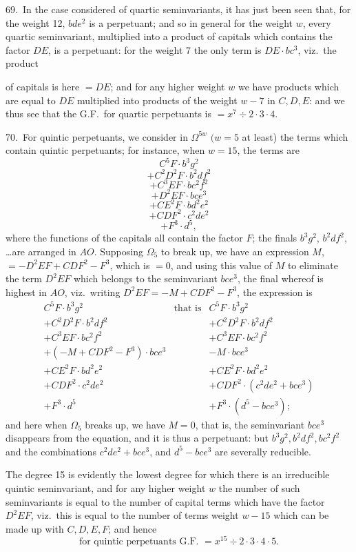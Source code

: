 \documentclass[11pt]{article}
\begin{document}
69.\ In the case considered of quartic seminvariants, it has just been seen that, for the weight 12, $bde^2$ is a perpetuant; and so in general for the weight $w$, every quartic seminvariant, multiplied into a product of capitals which contains the factor $DE$, is a perpetuant: for the weight 7 the only term is $DE \cdot bc^3$, viz.\ the product

\clearpage
of capitals is here $= DE$; and for any higher weight $w$ we have products which are equal to $DE$ multiplied into products of the weight $w - 7$ in $C, D, E$: and we thus see that the G.F.\ for quartic perpetuants is $= x^7 \div 2 \cdot 3 \cdot 4$.

70.\ For quintic perpetuants, we consider in $\Omega^{5w}$ $(w = 5$ at least) the terms which contain quintic perpetuants; for instance, when $w = 15$, the terms are
\[
C^5F \cdot b^3g^2
\]
\[
+ C^2D^2F \cdot b^2df^2
\]
\[
+ C^3EF \cdot bc^2f^2
\]
\[
+ D^2EF \cdot bce^3
\]
\[
+ CE^2F \cdot bd^2e^2
\]
\[
+ CDF^2 \cdot c^2de^2
\]
\[
+ F^3 \cdot d^5,
\]
where the functions of the capitals all contain the factor $F$; the finals $b^3g^2$, $b^2df^2$, \ldots are arranged in $AO$. Supposing $\Omega_5$ to break up, we have an expression $M$, $= -D^2EF + CDF^2 - F^3$, which is $= 0$, and using this value of $M$ to eliminate the term $D^2EF$ which belongs to the seminvariant $bce^3$, the final whereof is highest in $AO$, viz.\ writing $D^2EF = -M + CDF^2 - F^3$, the expression is
\[
\begin{array}{lll}
C^5F \cdot b^3g^2 & \text{that is} & C^5F \cdot b^3g^2 \\
+ C^2D^2F \cdot b^2df^2 & & + C^2D^2F \cdot b^2df^2 \\
+ C^3EF \cdot bc^2f^2 & & + C^3EF \cdot bc^2f^2 \\
+ (-M + CDF^2 - F^3) \cdot bce^3 & & - M \cdot bce^3 \\
+ CE^2F \cdot bd^2e^2 & & + CE^2F \cdot bd^2e^2 \\
+ CDF^2 \cdot c^2de^2 & & + CDF^2 \cdot (c^2de^2 + bce^3) \\
+ F^3 \cdot d^5 & & + F^3 \cdot (d^5 - bce^3);
\end{array}
\]
and here when $\Omega_5$ breaks up, we have $M = 0$, that is, the seminvariant $bce^3$ disappears from the equation, and it is thus a perpetuant: but $b^3g^2, b^2df^2, bc^2f^2$ and the combinations $c^2de^2 + bce^3$, and $d^5 - bce^3$ are severally reducible.

The degree 15 is evidently the lowest degree for which there is an irreducible quintic seminvariant, and for any higher weight $w$ the number of such seminvariants is equal to the number of capital terms which have the factor $D^2EF$, viz.\ this is equal to the number of terms weight $w - 15$ which can be made up with $C, D, E, F$; and hence
\[
\text{for quintic perpetuants G.F.\ }= x^{15} \div 2 \cdot 3 \cdot 4 \cdot 5.
\]
\end{document}
